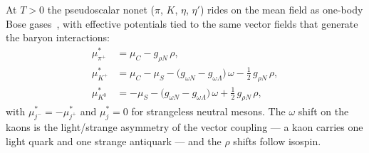 \documentclass[aps,prc,onecolumn,superscriptaddress,nofootinbib,10pt]{revtex4-2}
\newcommand{\muC}{\mu_C}
\newcommand{\muS}{\mu_S}
\begin{document}
At $T>0$ the pseudoscalar nonet ($\pi$, $K$, $\eta$, $\eta'$) rides on the
mean field as one-body Bose gases~\cite{Lavagno2010}, with effective potentials tied to
the same vector fields that generate the baryon interactions:
%
\begin{align}
\mu^{*}_{\pi^+} &= \muC - g_{\rho N}\, \rho ,
\nonumber\\
\mu^{*}_{K^+} &= \muC - \muS
   - \big( g_{\omega N} - g_{\omega \Lambda} \big)\, \omega
   - \tfrac12\, g_{\rho N}\, \rho ,
\label{eq:mesonshifts}\\
\mu^{*}_{K^0} &= - \muS
   - \big( g_{\omega N} - g_{\omega \Lambda} \big)\, \omega
   + \tfrac12\, g_{\rho N}\, \rho ,
\nonumber
\end{align}
%
with $\mu^{*}_{j^-} = -\mu^{*}_{j^+}$ and $\mu^{*}_j = 0$ for strangeless
neutral mesons. The $\omega$ shift on the kaons is the light/strange asymmetry
of the vector coupling --- a kaon carries one light quark and one strange
antiquark --- and the $\rho$ shifts follow isospin.
\end{document}
